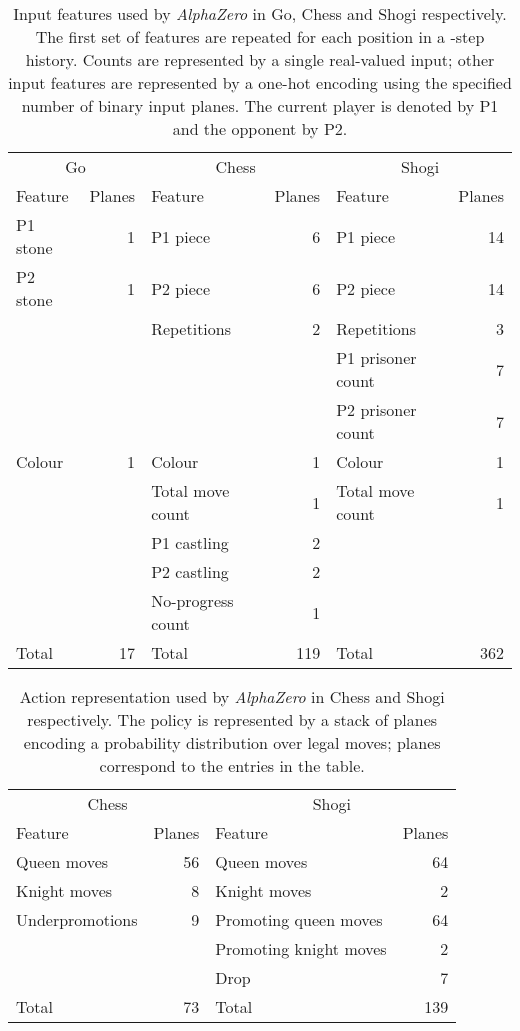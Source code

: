 \documentclass[12pt]{article}
\begin{document}
\begin{table}
\begin{tabularx}{\textwidth}{Xr | Xr | Xr}
\toprule
\multicolumn{2}{c}{Go} & \multicolumn{2}{|c|}{Chess} & \multicolumn{2}{c}{Shogi} \\
Feature & Planes & Feature & Planes & Feature & Planes \\
\midrule
P1 stone & 1 & P1 piece & 6 & P1 piece & 14 \\
P2 stone & 1 & P2 piece & 6 & P2 piece & 14 \\
&& Repetitions & 2 & Repetitions & 3 \\
&& && P1 prisoner count & 7 \\
&& && P2 prisoner count & 7 \\
\midrule
Colour & 1 & Colour & 1 & Colour & 1 \\
&& Total move count & 1 & Total move count & 1 \\
&& P1 castling & 2 &&\\
&& P2 castling & 2 &&\\
&& No-progress count & 1 &&\\
\midrule
Total & 17 & Total & 119 & Total & 362 \\
\bottomrule
\end{tabularx}
\caption
{
    \label{tab:features}
    Input features used by \emph{AlphaZero} in Go, Chess and Shogi respectively. The first set of features are repeated for each position in a -step history. Counts are represented by a single real-valued input; other input features are represented by a one-hot encoding using the specified number of binary input planes. The current player is denoted by P1 and the opponent by P2.
}
\end{table}

\begin{table}
\begin{tabularx}{\textwidth}{Xr | Xr}
\toprule
\multicolumn{2}{c|}{Chess} & \multicolumn{2}{c}{Shogi} \\
Feature & Planes & Feature & Planes \\
\midrule
Queen moves & 56 & Queen moves & 64 \\
Knight moves & 8 & Knight moves & 2 \\
Underpromotions & 9 & Promoting queen moves & 64 \\
&& Promoting knight moves & 2 \\
&& Drop & 7 \\
\midrule
Total & 73 & Total & 139 \\
\bottomrule
\end{tabularx}
\caption
{
    \label{tab:actions}
    Action representation used by \emph{AlphaZero} in Chess and Shogi respectively. The policy is represented by a stack of planes encoding a probability distribution over legal moves; planes correspond to the entries in the table.  
}
\end{table}
\end{document}
